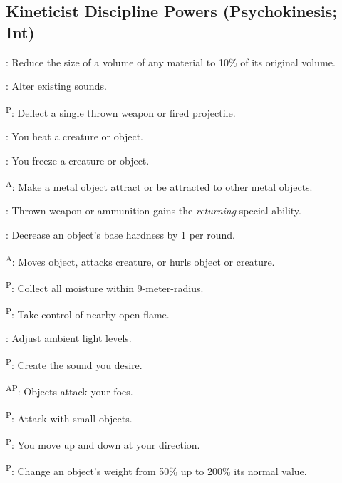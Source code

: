 \subsection{Kineticist Discipline Powers {\normalsize(Psychokinesis; Int)}}
\begin{enumerate*}
\item {}: Reduce the size of a volume of any material to 10\% of its original volume.

      : Alter existing sounds.

      \textsuperscript{P}: Deflect a single thrown weapon or fired projectile.

      : You heat a creature or object.

      : You freeze a creature or object.

      \textsuperscript{A}: Make a metal object attract or be attracted to other metal objects.

      : Thrown weapon or ammunition gains the \emph{returning} special ability.

      : Decrease an object's base hardness by 1 per round.

      \textsuperscript{A}: Moves object, attacks creature, or hurls object or creature.

\item {}\textsuperscript{P}: Collect all moisture within 9-meter-radius.

      \textsuperscript{P}: Take control of nearby open flame.

      : Adjust ambient light levels.

      \textsuperscript{P}: Create the sound you desire.
      
\item {}\textsuperscript{AP}: Objects attack your foes.

      \textsuperscript{P}: Attack with small objects.

      \textsuperscript{P}: You move up and down at your direction.

      \textsuperscript{P}: Change an object's weight from 50\% up to 200\% its normal value.


\end{enumerate*}
